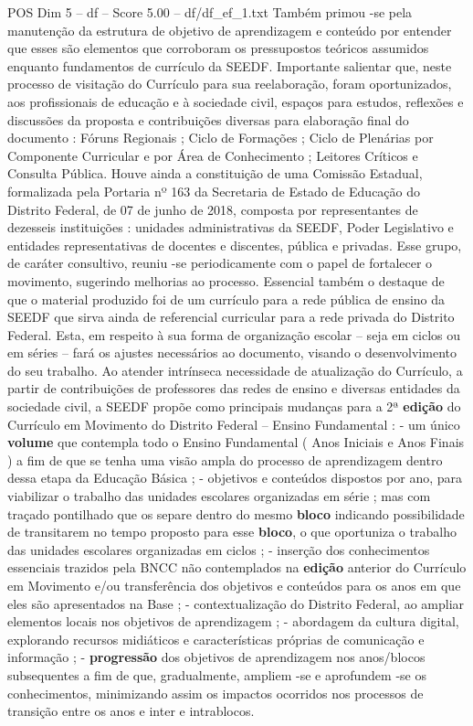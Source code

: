\begin{textsample}{POS Dim 5 – df – Score 5.00 – df/df\_ef\_1.txt}
Também primou -se pela manutenção da estrutura de objetivo de aprendizagem e conteúdo por entender que esses são elementos que corroboram os pressupostos teóricos assumidos enquanto fundamentos de currículo da SEEDF.
Importante salientar que, neste processo de visitação do Currículo para sua reelaboração, foram oportunizados, aos profissionais de educação e à sociedade civil, espaços para estudos, reflexões e discussões da proposta e contribuições diversas para elaboração final do documento : Fóruns Regionais ; Ciclo de Formações ; Ciclo de Plenárias por Componente Curricular e por Área de Conhecimento ; Leitores Críticos e Consulta Pública.
Houve ainda a constituição de uma Comissão Estadual, formalizada pela Portaria nº 163 da Secretaria de Estado de Educação do Distrito Federal, de 07 de junho de 2018, composta por representantes de dezesseis instituições : unidades administrativas da SEEDF, Poder Legislativo e entidades representativas de docentes e discentes, pública e privadas.
Esse grupo, de caráter consultivo, reuniu -se periodicamente com o papel de fortalecer o movimento, sugerindo melhorias ao processo.
Essencial também o destaque de que o material produzido foi de um currículo para a rede pública de ensino da SEEDF que sirva ainda de referencial curricular para a rede privada do Distrito Federal.
Esta, em respeito à sua forma de organização escolar – seja em ciclos ou em séries – fará os ajustes necessários ao documento, visando o desenvolvimento do seu trabalho.
Ao atender intrínseca necessidade de atualização do Currículo, a partir de contribuições de professores das redes de ensino e diversas entidades da sociedade civil, a SEEDF propõe como principais mudanças para a 2ª \textbf{edição} do Currículo em Movimento do Distrito Federal – Ensino Fundamental : - um único \textbf{volume} que contempla todo o Ensino Fundamental ( Anos Iniciais e Anos Finais ) a fim de que se tenha uma visão ampla do processo de aprendizagem dentro dessa etapa da Educação Básica ; - objetivos e conteúdos dispostos por ano, para viabilizar o trabalho das unidades escolares organizadas em série ; mas com traçado pontilhado que os separe dentro do mesmo \textbf{bloco} indicando possibilidade de transitarem no tempo proposto para esse \textbf{bloco}, o que oportuniza o trabalho das unidades escolares organizadas em ciclos ; - inserção dos conhecimentos essenciais trazidos pela BNCC não contemplados na \textbf{edição} anterior do Currículo em Movimento e/ou transferência dos objetivos e conteúdos para os anos em que eles são apresentados na Base ; - contextualização do Distrito Federal, ao ampliar elementos locais nos objetivos de aprendizagem ; - abordagem da cultura digital, explorando recursos midiáticos e características próprias de comunicação e informação ; - \textbf{progressão} dos objetivos de aprendizagem nos anos/blocos subsequentes a fim de que, gradualmente, ampliem -se e aprofundem -se os conhecimentos, minimizando assim os impactos ocorridos nos processos de transição entre os anos e inter e intrablocos.

\end{textsample}
